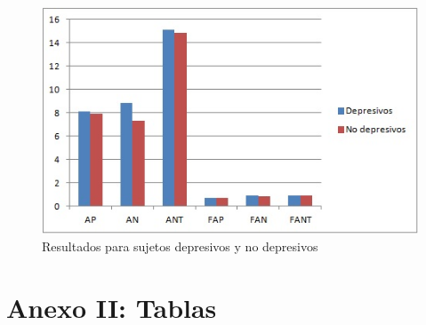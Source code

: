 \documentclass[a4paper,11pt]{article}
\begin{document}
\begin{figure}[h!]
	\centering
	\includegraphics[width=0.55\linewidth]{informe1_3}
	\caption{Resultados para sujetos depresivos y no depresivos}
\end{figure}

\newpage

\section{Anexo II: Tablas}
\end{document}
